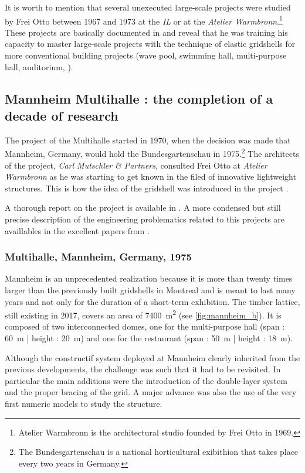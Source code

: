 It is worth to mention that several unexecuted large-scale projects were studied by Frei Otto between 1967 and 1973 at the \emph{IL} or at the \emph{Atelier Warmbronn}.\footnote{Atelier Warmbronn is the architectural studio founded by Frei Otto in 1969.} These projects are basically documented in \cite[pp.~278 - 288]{IL10} and reveal that he was training his capacity to master large-scale projects with the technique of elastic gridshells for more conventional building projects (wave pool, swimming hall, multi-purpose hall, auditorium, \telp{}).

\subsection{Mannheim Multihalle : the completion of a decade of research}
The project of the Multihalle started in 1970, when the decision was made that Mannheim, Germany, would hold the Bundesgartenschau in 1975.\footnote{The Bundesgartenschau is a national horticultural exibithion that takes place every two years in Germany.} The architects of the project, \emph{Carl Mutschler \& Partners}, consulted Frei Otto at \emph{Atelier Warmbronn} as he was starting to get known in the filed of innovative lightweight structures. This is how the idea of the gridshell was introduced in the project \cite{Liddell2015}. 

A thorough report on the project is available in \cite{IL13}.  A more condensed but still precise description of the engineering problematics related to this projects are availlables in the excellent papers from \citet{Happold1975, Liddell2015}.

\subsubsection{Multihalle, Mannheim, Germany, 1975}
Mannheim is an unprecedented realization because it is more than twenty times larger than the previously built gridshells in Montreal and is meant to last many years and not only for the duration of a short-term exhibition. The timber lattice, still existing in 2017,  covers an area of \SI{7400}{m^2} (see \cref{fig:mannheim_b}). It is composed of two interconnected domes, one for the multi-purpose hall (span : \SI{60}{m} | height : \SI{20}{m}) and one for the restaurant (span : \SI{50}{m} | height : \SI{18}{m}).

Although the constructif system deployed at Mannheim clearly inherited from the previous developments, the challenge was such that it had to be revisited. In particular the main additions were the introduction of the double-layer system and the proper bracing of the grid. A major advance was also the use of the very first numeric models to study the structure. 

